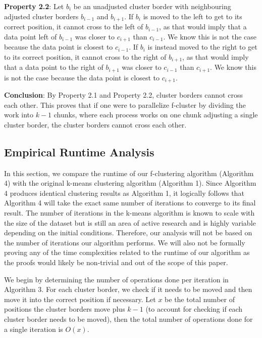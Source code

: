\documentclass[conference,compsoc]{IEEEtran}
\begin{document}
\textbf{Property 2.2}: Let $b_i$ be an unadjusted cluster border with neighbouring adjusted cluster borders $b_{i-1}$ and $b_{i+1}$. If $b_i$ is moved to the left to get to its correct position, it cannot cross to the left of $b_{i-1}$, as that would imply that a data point left of $b_{i-1}$ was closer to $c_{i+1}$ than $c_{i-1}$. We know this is not the case because the data point is closest to $c_{i-1}$. If $b_i$ is instead moved to the right to get to its correct position, it cannot cross to the right of $b_{i+1}$, as that would imply that a data point to the right of $b_{i+1}$ was closer to $c_{i-1}$ than $c_{i+1}$. We know this is not the case because the data point is closest to $c_{i+1}$.

\textbf{Conclusion}: By Property 2.1 and Property 2.2, cluster borders cannot cross each other. This proves that if one were to parallelize f-cluster by dividing the work into $k-1$ chunks, where each process works on one chunk adjusting a single cluster border, the cluster borders cannot cross each other.


\subsection{Empirical Runtime Analysis}

In this section, we compare the runtime of our f-clustering algorithm (Algorithm 4) with the original k-means clustering algorithm (Algorithm 1). Since Algorithm 4 produces identical clustering results as Algorithm 1, it logically follows that Algorithm 4 will take the exact same number of iterations to converge to its final result. The number of iterations in the k-means algorithm is known to scale with the size of the dataset \cite{b7} but is still an area of active research and is highly variable depending on the initial conditions. Therefore, our analysis will not be based on the number of iterations our algorithm performs. We will also not be formally proving any of the time complexities related to the runtime of our algorithm as the proofs would likely be non-trivial and out of the scope of this paper.

We begin by determining the number of operations done per iteration in Algorithm 3. For each cluster border, we check if it needs to be moved and then move it into the correct position if necessary. Let $x$ be the total number of positions the cluster borders move plus $k-1$ (to account for checking if each cluster border needs to be moved), then the total number of operations done for a single iteration is $O(x)$.
\end{document}
